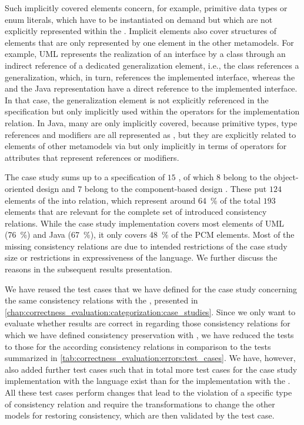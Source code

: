 Such implicitly covered elements concern, for example, primitive data types or enum literals, which have to be instantiated on demand but which are not explicitly represented within the \commonalities.
Implicit elements also cover structures of elements that are only represented by one element in the other metamodels.
For example, \gls{UML} represents the realization of an interface by a class through an indirect reference of a dedicated generalization element, i.e., the class references a generalization, which, in turn, references the implemented interface, whereas the \commonality and the Java representation have a direct reference to the implemented interface.
In that case, the generalization element is not explicitly referenced in the \commonality specification but only implicitly used within the operators for the implementation relation.
In Java, many \metaclasses are only implicitly covered, because primitive types, type references and modifiers are all represented as \metaclasses, but they are explicitly related to elements of other metamodels via \commonalities but only implicitly in terms of operators for attributes that represent references or modifiers.

The case study sums up to a specification of $15$ \commonalities, of which $8$ belong to the object-oriented design \conceptmetamodel and $7$ belong to the component-based design \conceptmetamodel.
These \commonalities put $124$ elements of the \concretemetamodels into relation, which represent around \SI{64}{\percent} of the total $193$ elements that are relevant for the complete set of introduced consistency relations.
While the case study implementation covers most elements of \gls{UML} (\SI{76}{\percent}) and Java (\SI{67}{\percent}), it only covers \SI{48}{\percent} of the \gls{PCM} elements.
Most of the missing consistency relations are due to intended restrictions of the case study size or restrictions in expressiveness of the \commonalities language.
We further discuss the reasons in the subsequent results presentation.

We have reused the test cases that we have defined for the case study concerning the same consistency relations with the \reactionslanguage, presented in \autoref{chap:correctness_evaluation:categorization:case_studies}.
Since we only want to evaluate whether results are correct in regarding those consistency relations for which we have defined consistency preservation with \commonalities, we have reduced the tests to those for the according consistency relations in comparison to the tests summarized in \autoref{tab:correctness_evaluation:errors:test_cases}.
We have, however, also added further test cases such that in total more test cases for the case study implementation with the \commonalities language exist than for the implementation with the \reactionslanguage.
All these test cases perform changes that lead to the violation of a specific type of consistency relation and require the transformations to change the other models for restoring consistency, which are then validated by the test case.

